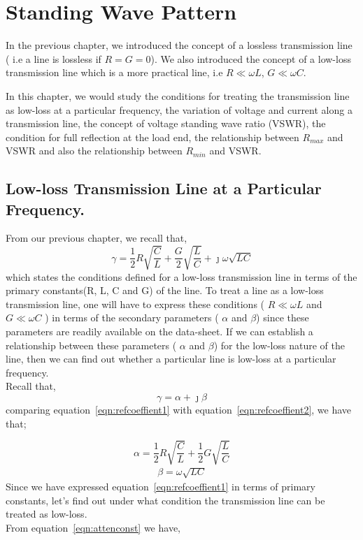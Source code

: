 \chapter{Standing Wave Pattern}\label{lec:lec5}
In the previous chapter, we introduced the concept of a lossless transmission line ( i.e a line is lossless if $R=G=0$). We also introduced the concept of a low-loss transmission line which is a more practical line, i.e $R \ll \omega L$, $G \ll \omega C $.

In this chapter, we would study the conditions for treating the transmission line as low-loss at a particular frequency, the variation of voltage and current along a transmission line, the concept of voltage standing wave ratio (VSWR), the condition for full reflection at the load end, the relationship between $R_{max}$ and VSWR and also the relationship between $R_{min}$ and VSWR.
\section{Low-loss Transmission Line at a Particular Frequency.}
From our previous chapter, we recall that,
\begin{equation}
\gamma = \frac{1}{2}R\sqrt{\frac{C}{L}} + \frac{G}{2}\sqrt{\frac{L}{C}} +\jmath\omega\sqrt{LC}
\label{eqn:refcoeffient1}
\end{equation}
which states the conditions defined for a low-loss transmission line in terms of the primary constants(R, L, C and G) of the line. To treat a line as a low-loss transmission line, one will have to express these conditions ( $R \ll \omega L$ and $G \ll \omega C$ ) in terms of the secondary parameters ( $\alpha$ and $\beta $) since these parameters are readily available on the data-sheet. If we can establish a relationship between these parameters ( $\alpha$ and $\beta $) for the low-loss nature of the line, then we can find out whether a particular line is low-loss at a particular frequency.\\
Recall that,
\begin{equation}
\gamma = \alpha + \jmath\beta
\label{eqn:refcoeffient2}
\end{equation}
comparing equation~\ref{eqn:refcoeffient1} with equation~\ref{eqn:refcoeffient2}, we have that;
 
\begin{equation}
\alpha = \frac{1}{2}R\sqrt{\frac{C}{L}} + \frac{1}{2}G\sqrt{\frac{L}{C}}	
\label{eqn:attenconst}
\end{equation}
\begin{align}
\beta = \omega\sqrt{LC}
\end{align}
Since we have expressed equation~\ref{eqn:refcoeffient1} in terms of primary constants, let's find out under what condition the transmission line can be treated as low-loss.\\
From equation~\ref{eqn:attenconst} we have,

